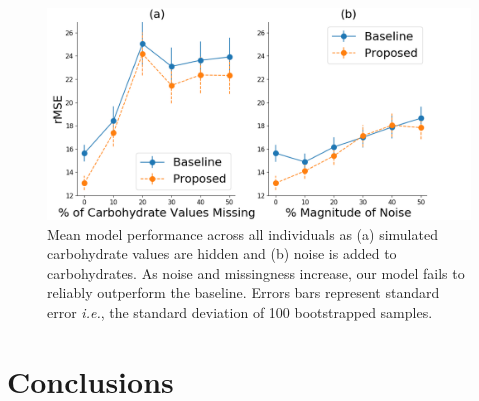 \documentclass[letterpaper]{article}
\begin{document}
\begin{figure}[t]
\centering
\includegraphics[height=1.62 in]{carbmissplot.png}
\caption{Mean model performance across all individuals as (a) simulated carbohydrate values are hidden and (b) noise is added to carbohydrates. As noise and missingness increase, our model fails to reliably outperform the baseline. Errors bars represent standard error \textit{i.e.}, the standard deviation of 100 bootstrapped samples.  }\label{fig:carbmiss}
\end{figure}








\vspace{-1.78mm}
\section{Conclusions}
\end{document}

